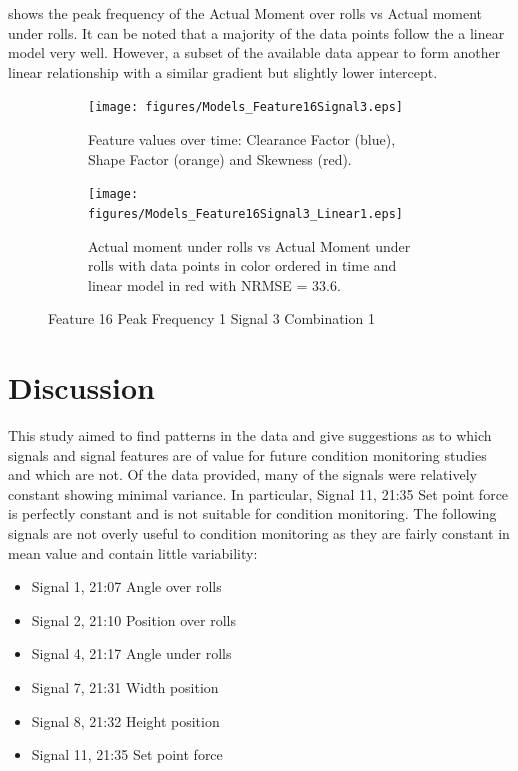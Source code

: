 \documentclass[]{article}
\begin{document}
 shows the peak frequency of the Actual Moment over rolls vs Actual moment under rolls. It can be noted that a majority of the data points follow the a linear model very well. However, a subset of the available data appear to form another linear relationship with a similar gradient but slightly lower intercept.
\begin{figure}[H]
	\centering
	\begin{subfigure}[t]{.45\textwidth}
		\centering
    		\texttt{[image: figures/Models\_Feature16Signal3.eps]}
	 	\caption{Feature values over time: Clearance Factor (blue), Shape Factor (orange) and Skewness (red).}
	  	\label{fig:Models_Feature16Signal3}
	\end{subfigure}
	\hspace*{\fill}%
	\begin{subfigure}[t]{.45\textwidth}
	  \centering
 	   	\texttt{[image: figures/Models\_Feature16Signal3\_Linear1.eps]}
	  	\caption{Actual moment under rolls vs Actual Moment under rolls with data points in color ordered in time and linear model in red with \gls{NRMSE} = 33.6.}
	  	\label{fig:Models_Feature16Signal3_Linear1}
	\end{subfigure}
   	\caption{Feature 16 Peak Frequency 1 Signal 3 Combination 1}
    \label{fig:Models_Feature16Signal3_Caption}
\end{figure}

\clearpage 

\section{Discussion}
This study aimed to find patterns in the data and  give suggestions as to which signals and signal features are of value for future condition monitoring studies and which are not. Of the data provided, many of the signals were relatively constant showing minimal variance. In particular, Signal 11, 21:35 Set point force is perfectly constant and is not suitable for condition monitoring. The following signals are not overly useful to condition monitoring as they are fairly constant in mean value and contain little variability: 
\begin{itemize}
\item Signal 1, 21:07 Angle over rolls
\item Signal 2, 21:10 Position over rolls
\item Signal 4, 21:17 Angle under rolls
\item Signal 7, 21:31 Width position
\item Signal 8, 21:32 Height position
\item Signal 11, 21:35 Set point force
\end{itemize}
\end{document}
